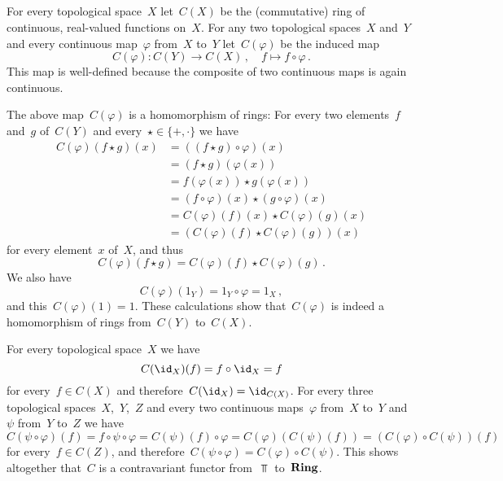 \subsection{}

For every topological space~$X$ let~$C(X)$ be the (commutative) ring of continuous, real-valued functions on~$X$.
For any two topological spaces~$X$ and~$Y$ and every continuous map~$\varphi$ from~$X$ to~$Y$ let~$C(\varphi)$ be the induced map
\[
	C(\varphi)
	\colon
	C(Y)
	\to
	C(X) \,,
	\quad
	f
	\mapsto
	f \circ \varphi \,.
\]
This map is well-defined because the composite of two continuous maps is again continuous.

The above map~$C(\varphi)$ is a homomorphism of rings:
For every two elements~$f$ and~$g$ of~$C(Y)$ and every~$\star \in \{+, \cdot\}$ we have
\begin{align*}
	C(\varphi)(f \star g)(x)
	&=
	((f \star g) \circ \varphi)(x)
	\\
	&=
	(f \star g)(\varphi(x))
	\\
	&=
	f(\varphi(x)) \star g(\varphi(x))
	\\
	&=
	(f \circ \varphi)(x) \star (g \circ \varphi)(x)
	\\
	&=
	C(\varphi)(f)(x) \star C(\varphi)(g)(x)
	\\
	&=
	(C(\varphi)(f) \star C(\varphi)(g))(x)
\end{align*}
for every element~$x$ of~$X$, and thus
\[
	C(\varphi)(f \star g)
	=
	C(\varphi)(f) \star C(\varphi)(g) \,.
\]
We also have
\[
	C(\varphi)(1_Y)
	=
	1_Y \circ \varphi
	=
	1_X \,,
\]
and this~$C(\varphi)(1) = 1$.
These calculations show that~$C(\varphi)$ is indeed a homomorphism of rings from~$C(Y)$ to~$C(X)$.

For every topological space~$X$ we have
\[
	C(\id_X)(f)
	=
	f \circ \id_X
	=
	f
\]
for every~$f \in C(X)$ and therefore~$C(\id_X) = \id_{C(X)}$.
For every three topological spaces~$X$,~$Y$,~$Z$ and every two continuous maps~$\varphi$ from~$X$ to~$Y$ and~$\psi$ from~$Y$ to~$Z$ we have
\[
	C(\psi \circ \varphi)(f)
	=
	f \circ \psi \circ \varphi
	=
	C(\psi)(f) \circ \varphi
	=
	C(\varphi)( C(\psi)(f) )
	=
	( C(\varphi) \circ C(\psi) )(f)
\]
for every~$f \in C(Z)$, and therefore~$C(\psi \circ \varphi) = C(\varphi) \circ C(\psi)$.
This shows altogether that~$C$ is a contravariant functor from~$\Top$ to~$\mathbf{Ring}$.
